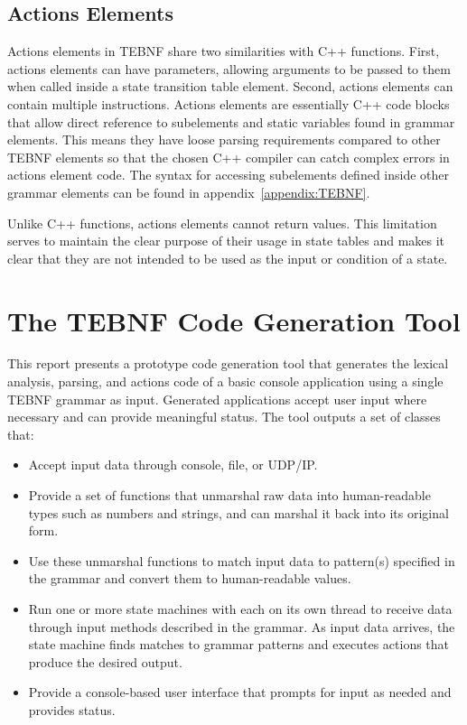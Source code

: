 \subsection{Actions Elements} \label{ssec:ActionsElements}
Actions elements in TEBNF share two similarities with C++ functions. First, actions elements can have parameters, allowing arguments to be passed to them when called inside a state transition table element.  Second, actions elements can contain multiple instructions.  Actions elements are essentially C++ code blocks that allow direct reference to subelements and static variables found in grammar elements.  This means they have loose parsing requirements compared to other TEBNF elements so that the chosen C++ compiler can catch complex errors in actions element code.  The syntax for accessing subelements defined inside other grammar elements can be found in appendix~\ref{appendix:TEBNF}.

\indent
Unlike C++ functions, actions elements cannot return values.  This limitation serves to maintain the clear purpose of their usage in state tables and makes it clear that they are not intended to be used as the input or condition of a state.

\section{The TEBNF Code Generation Tool}
This report presents a prototype code generation tool that generates the lexical analysis, parsing, and actions code of a basic console application using a single TEBNF grammar as input.  Generated applications accept user input where necessary and can provide meaningful status.  The tool outputs a set of classes that:
\begin{itemize}
  \item Accept input data through console, file, or UDP/IP.
  \item Provide a set of functions that unmarshal raw data into human-readable types such as numbers and strings, and can marshal it back into its original form.
  \item Use these unmarshal functions to match input data to pattern(s) specified in the grammar and convert them to human-readable values.
  \item Run one or more state machines with each on its own thread to receive data through input methods described in the grammar.  As input data arrives, the state machine finds matches to grammar patterns and executes actions that produce the desired output.
  \item Provide a console-based user interface that prompts for input as needed and provides status.
\end{itemize}

